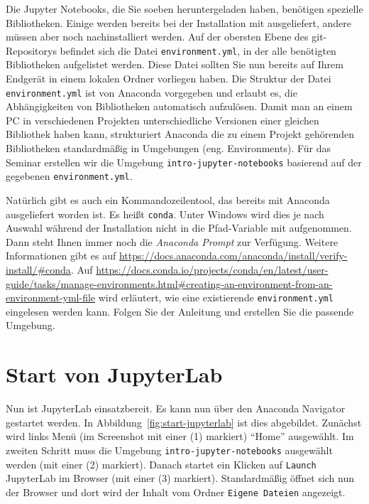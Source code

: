 \documentclass{tufte-handout}
\begin{document}
Die Jupyter Notebooks, die Sie soeben heruntergeladen haben, benötigen  spezielle Bibliotheken.
Einige werden bereits bei der Installation mit ausgeliefert, andere müssen aber noch nachinstalliert werden.
Auf der obersten Ebene des git-Repositorys befindet sich die Datei \texttt{environment.yml}, in der alle benötigten Bibliotheken aufgelistet werden.
Diese Datei sollten Sie nun bereits auf Ihrem Endgerät in einem lokalen Ordner vorliegen haben.
Die Struktur der Datei \texttt{environment.yml} ist von Anaconda vorgegeben und erlaubt es, die Abhängigkeiten von Bibliotheken automatisch aufzulösen.
Damit man an einem PC in verschiedenen Projekten unterschiedliche Versionen einer gleichen Bibliothek haben kann,
strukturiert Anaconda die zu einem Projekt gehörenden Bibliotheken standardmäßig in Umgebungen (eng. Environments).
Für das Seminar erstellen wir die Umgebung \texttt{intro-jupyter-notebooks} basierend auf der gegebenen \texttt{environment.yml}.

Natürlich gibt es auch ein Kommandozeilentool, das bereits mit Anaconda ausgeliefert worden ist.
Es heißt \texttt{conda}.
Unter Windows wird dies je nach Auswahl während der Installation nicht in die Pfad-Variable mit aufgenommen.
Dann steht Ihnen immer noch die \emph{Anaconda Prompt} zur Verfügung.
Weitere Informationen gibt es auf
\url{https://docs.anaconda.com/anaconda/install/verify-install/#conda}.
Auf
\url{https://docs.conda.io/projects/conda/en/latest/user-guide/tasks/manage-environments.html#creating-an-environment-from-an-environment-yml-file}
wird erläutert, wie eine existierende \texttt{environment.yml} eingelesen werden kann.
Folgen Sie der Anleitung und erstellen Sie die passende Umgebung.

\section{Start von JupyterLab}

Nun ist JupyterLab einsatzbereit.
Es kann nun über den Anaconda Navigator gestartet werden.
In Abbildung~\ref{fig:start-jupyterlab} ist dies abgebildet.
Zunächst wird links Menü
(im Screenshot mit einer (1) markiert)
\enquote{Home} ausgewählt.
Im zweiten Schritt muss die Umgebung \texttt{intro-jupyter-notebooks} ausgewählt werden
(mit einer (2) markiert).
Danach startet ein Klicken auf \texttt{Launch} JupyterLab im Browser
(mit einer (3) markiert).
Standardmäßig öffnet sich nun der Browser und dort wird der Inhalt vom Ordner \texttt{Eigene Dateien} angezeigt.
\end{document}
